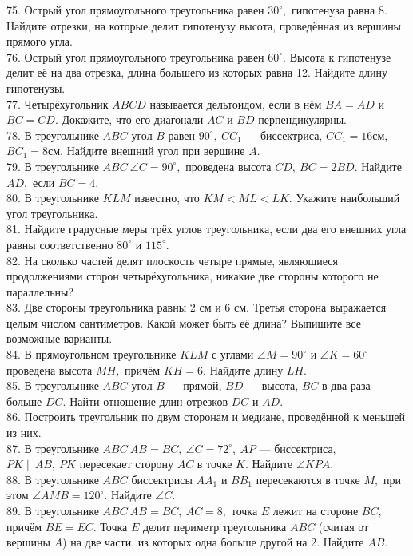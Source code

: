 75. Острый угол прямоугольного треугольника равен $30^\circ,$ гипотенуза равна 8. Найдите отрезки, на которые делит гипотенузу высота, проведённая из вершины прямого угла.\\
76. Острый угол прямоугольного треугольника равен $60^\circ.$ Высота к гипотенузе делит её на два отрезка, длина большего из которых равна 12. Найдите длину гипотенузы.\\
77. Четырёхугольник $ABCD$ называется дельтоидом, если в нём $BA=AD$ и $BC=CD.$ Докажите, что его диагонали $AC$ и $BD$ перпендикулярны.\\
78. В треугольнике $ABC$ угол $B$ равен $90^\circ,\ CC_1$ --- биссектриса, $CC_1=16$см, $BC_1=8$см. Найдите внешний угол при вершине $A.$\\
79. В треугольнике $ABC\ \angle C=90^\circ,$ проведена высота $CD,\ BC=2BD.$ Найдите $AD,$ если $BC=4.$\\
80. В треугольнике $KLM$ известно, что $KM<ML<LK.$ Укажите наибольший угол треугольника.\\
81. Найдите градусные меры трёх углов треугольника, если два его внешних угла равны соответственно $80^\circ$ и $115^\circ.$\\
82. На сколько частей делят плоскость четыре прямые, являющиеся продолжениями сторон четырёхугольника, никакие две стороны которого не параллельны?\\
83. Две стороны треугольника равны 2 см и 6 см. Третья сторона выражается целым числом сантиметров. Какой может быть её длина? Выпишите все возможные варианты.\\
84. В прямоугольном треугольнике $KLM$ с углами $\angle M=90^\circ$ и $\angle K=60^\circ$ проведена высота $MH,$ причём $KH=6.$ Найдите длину $LH.$\\
85. В треугольнике $ABC$ угол $B$ --- прямой, $BD$ --- высота,  $BC$ в два раза больше $DC.$ Найти отношение длин отрезков $DC$ и $AD.$\\
86. Построить треугольник по двум сторонам и медиане, проведённой к меньшей из них.\\
87. В треугольнике $ABC\ AB=BC,\ \angle C=72^\circ,\ AP$ --- биссектриса, $PK\parallel AB,\ PK$ пересекает сторону $AC$ в точке $K.$ Найдите $\angle KPA.$\\
88. В треугольнике $ABC$ биссектрисы $AA_1$ и $BB_1$ пересекаются в точке $M,$ при этом $\angle AMB=120^\circ.$ Найдите $\angle C.$\\
89. В треугольнике $ABC\ AB=BC,\ AC=8,$ точка $E$ лежит на стороне $BC,$ причём $BE=EC.$ Точка $E$ делит периметр треугольника $ABC$ (считая от вершины $A$) на две части, из которых одна больше другой на 2. Найдите $AB.$\\
